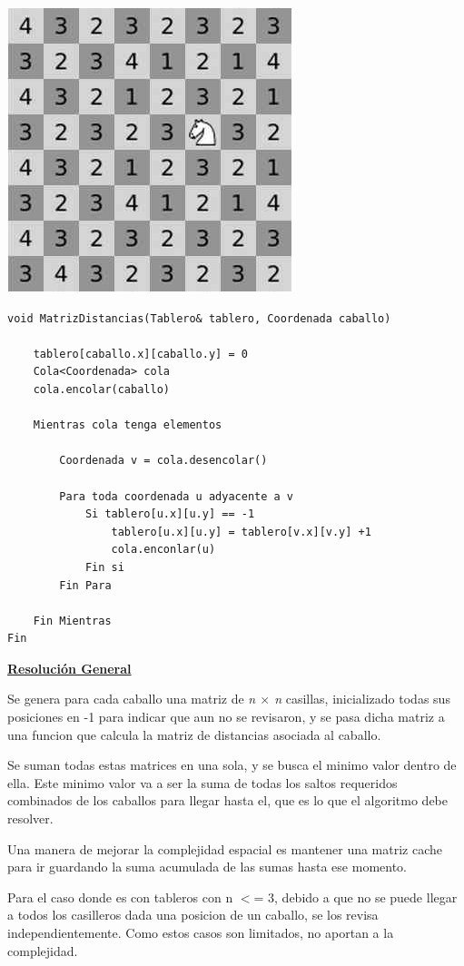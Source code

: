 \documentclass[10pt,a4paper]{article}
\begin{document}
\begin{center}
\includegraphics[scale=0.5]{img/knight_movements.png}
\end{center}
\newpage
\begin{lstlisting}
void MatrizDistancias(Tablero& tablero, Coordenada caballo)

	tablero[caballo.x][caballo.y] = 0
	Cola<Coordenada> cola
	cola.encolar(caballo)
	
	Mientras cola tenga elementos
	
		Coordenada v = cola.desencolar()
		
		Para toda coordenada u adyacente a v
			Si tablero[u.x][u.y] == -1
				tablero[u.x][u.y] = tablero[v.x][v.y] +1
				cola.enconlar(u)	
			Fin si
		Fin Para
		
	Fin Mientras
Fin
\end{lstlisting}

\noindent \underline{\textbf{Resolución General}}

Se genera para cada caballo una matriz de \textit{n $\times$  n} casillas, inicializado todas sus posiciones en -1 para indicar que aun no se revisaron, y se pasa dicha matriz a una funcion que calcula la matriz de distancias asociada al caballo.

Se suman todas estas matrices en una sola, y se busca el minimo valor dentro de ella. Este minimo valor va a ser la suma de todas los saltos requeridos combinados de los caballos para llegar hasta el, que es lo que el algoritmo debe resolver. 

Una manera de mejorar la complejidad espacial es mantener una matriz cache para ir guardando la suma acumulada de las sumas hasta ese momento.

Para el caso donde es con tableros con n $<$= 3, debido a que no se puede llegar a todos los casilleros dada una posicion de un caballo, se los revisa independientemente. Como estos casos son limitados, no aportan a la complejidad.
\bigskip
\end{document}
